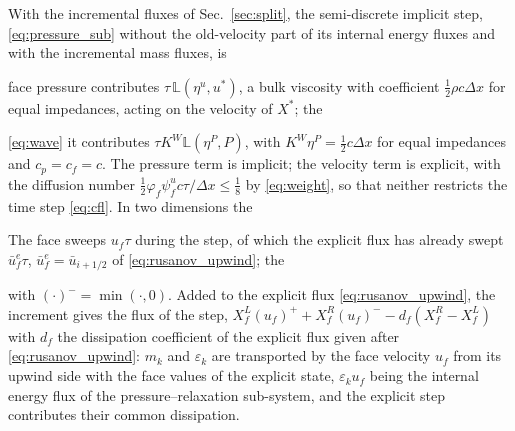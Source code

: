 With the incremental fluxes of Sec.~\ref{sec:split}, the semi-discrete implicit step, \eqref{eq:pressure_sub} without the old-velocity part of
its internal energy fluxes and with the incremental mass fluxes, is

face pressure contributes $\tau\,\mathbb L(\eta^u,u^*)$, a bulk viscosity with coefficient $\tfrac12\rho c\Delta x$ for equal impedances, acting on
the velocity of $X^*$; the

\eqref{eq:wave} it contributes $\tau K^W\mathbb L(\eta^P,P)$, with $K^W\eta^P=\tfrac12c\Delta x$ for equal impedances and $c_p=c_f=c$. The pressure term is implicit; the velocity term is explicit,
with the diffusion number $\tfrac12\varphi_f\psi^u_fc\tau/\Delta x\le\tfrac18$ by \eqref{eq:weight}, so that neither restricts the time step \eqref{eq:cfl}. In two dimensions the

The face sweeps $u_f\tau$ during the step, of which the explicit flux has already swept $\bar u^e_f\tau$, $\bar u^e_f=\bar u_{i+1/2}$ of \eqref{eq:rusanov_upwind}; the

with $(\cdot)^-=\min(\cdot,0)$. Added to the explicit flux \eqref{eq:rusanov_upwind}, the increment gives the flux of the step,
$X^L_f(u_f)^++X^R_f(u_f)^--d_f(X^R_f-X^L_f)$ with $d_f$ the dissipation coefficient of the explicit flux given after \eqref{eq:rusanov_upwind}: $m_k$ and $\varepsilon_k$ are transported by the
face velocity $u_f$ from its upwind side with the face values of the explicit state, $\varepsilon_ku_f$ being the internal energy flux of the
pressure--relaxation sub-system, and the explicit step contributes their common dissipation.

